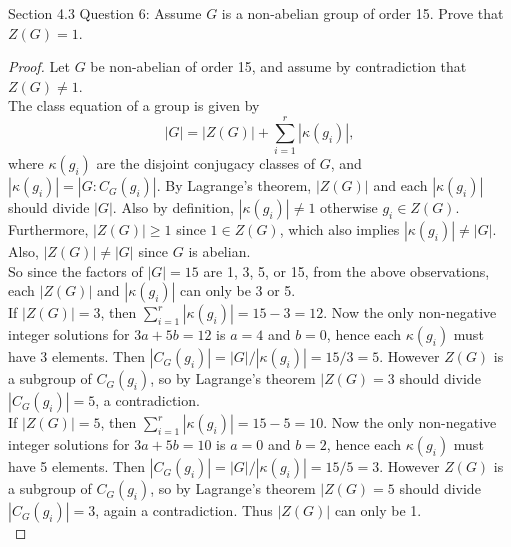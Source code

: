 Section 4.3 Question 6:
Assume $G$ is a non-abelian group of order 15. Prove that $Z(G)=1$.

\begin{proof}
  Let $G$ be non-abelian of order 15, and assume by contradiction that
  $Z(G)\neq 1$. \\

  The class equation of a group is given by
  \begin{equation*}
    |G| = |Z(G)| + \sum_{i=1}^r|\kappa(g_i)|,
  \end{equation*}
  where $\kappa(g_i)$ are the disjoint conjugacy classes of $G$, and
  $|\kappa(g_i)|=|G:C_G(g_i)|$. By Lagrange's theorem, $|Z(G)|$ and each
  $|\kappa(g_i)|$ should divide $|G|$. Also by definition,
  $|\kappa(g_i)|\neq 1$ otherwise $g_i\in Z(G)$. Furthermore, $|Z(G)|\geq
  1$ since $1\in Z(G)$, which also implies $|\kappa(g_i)|\neq|G|$. Also,
  $|Z(G)|\neq|G|$ since $G$ is abelian. \\

  So since the factors of $|G|=15$ are 1, 3, 5, or 15, from the above
  observations, each $|Z(G)|$ and $|\kappa(g_i)|$ can only be 3 or 5. \\

  If $|Z(G)|=3$, then $\sum_{i=1}^r|\kappa(g_i)|=15-3=12$. Now the only
  non-negative integer solutions for $3a+5b=12$ is $a=4$ and $b=0$, hence
  each $\kappa(g_i)$ must have 3 elements. Then
  $|C_G(g_i)|=|G|/|\kappa(g_i)|=15/3=5$. However $Z(G)$ is a subgroup of
  $C_G(g_i)$, so by Lagrange's theorem $|Z(G)=3$ should divide
  $|C_G(g_i)|=5$, a contradiction. \\

  If $|Z(G)|=5$, then $\sum_{i=1}^r|\kappa(g_i)|=15-5=10$. Now the only
  non-negative integer solutions for $3a+5b=10$ is $a=0$ and $b=2$, hence
  each $\kappa(g_i)$ must have 5 elements. Then
  $|C_G(g_i)|=|G|/|\kappa(g_i)|=15/5=3$. However $Z(G)$ is a subgroup of
  $C_G(g_i)$, so by Lagrange's theorem $|Z(G)=5$ should divide
  $|C_G(g_i)|=3$, again a contradiction. Thus $|Z(G)|$ can only be 1. \\
\end{proof}
